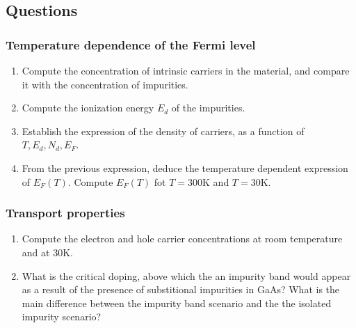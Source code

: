 \subsection*{Questions}

\subsubsection*{Temperature dependence of the Fermi level}

\begin{enumerate}[label=(\roman*)]
\item Compute the concentration of intrinsic carriers in the material,
  and compare it with the concentration of impurities.
\item Compute the ionization energy $E_d$ of the impurities.
\item Establish the expression of the density of carriers, as a
  function of $T, E_d, N_d, E_F$.
\item From the previous expression, deduce the temperature dependent
  expression of $E_F(T)$. Compute $E_F(T)$ fot $T=300$K and $T=30$K.
\end{enumerate}

\subsubsection*{Transport properties}

\begin{enumerate}[label=(\roman*)]
\item Compute the electron and hole carrier concentrations at room
  temperature and at $30$K.
\item What is the critical doping, above which the an impurity band
  would appear as a result of the presence of substitional
  impurities in GaAs? What is the main difference between the impurity
  band scenario and the the isolated impurity scenario?
\end{enumerate}




